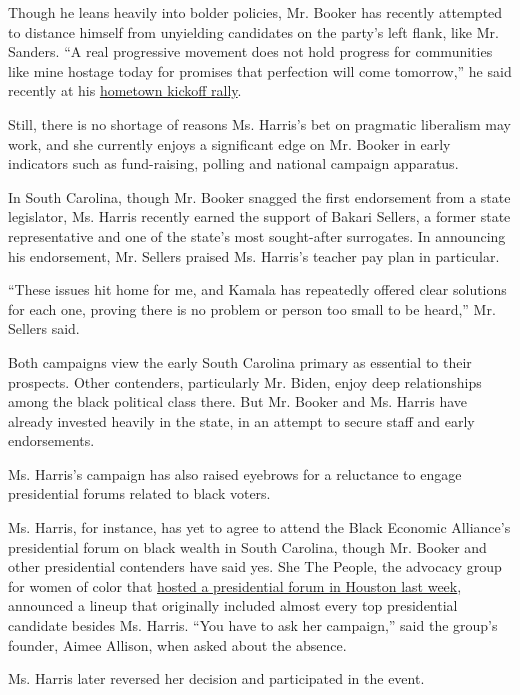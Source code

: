 Though he leans heavily into bolder policies, Mr. Booker has recently
attempted to distance himself from unyielding candidates on the party's
left flank, like Mr. Sanders. ``A real progressive movement does not
hold progress for communities like mine hostage today for promises that
perfection will come tomorrow,'' he said recently at his
\href{https://www.nytimes.com/2019/04/13/us/politics/cory-booker-newark.html}{hometown
kickoff rally}.

Still, there is no shortage of reasons Ms. Harris's bet on pragmatic
liberalism may work, and she currently enjoys a significant edge on Mr.
Booker in early indicators such as fund-raising, polling and national
campaign apparatus.

In South Carolina, though Mr. Booker snagged the first endorsement from
a state legislator, Ms. Harris recently earned the support of Bakari
Sellers, a former state representative and one of the state's most
sought-after surrogates. In announcing his endorsement, Mr. Sellers
praised Ms. Harris's teacher pay plan in particular.

``These issues hit home for me, and Kamala has repeatedly offered clear
solutions for each one, proving there is no problem or person too small
to be heard,'' Mr. Sellers said.

Both campaigns view the early South Carolina primary as essential to
their prospects. Other contenders, particularly Mr. Biden, enjoy deep
relationships among the black political class there. But Mr. Booker and
Ms. Harris have already invested heavily in the state, in an attempt to
secure staff and early endorsements.

Ms. Harris's campaign has also raised eyebrows for a reluctance to
engage presidential forums related to black voters.

Ms. Harris, for instance, has yet to agree to attend the Black Economic
Alliance's presidential forum on black wealth in South Carolina, though
Mr. Booker and other presidential contenders have said yes. She The
People, the advocacy group for women of color that
\href{https://www.nytimes.com/2019/04/24/us/politics/she-the-people-forum-2020-women.html}{hosted
a presidential forum in Houston last week}, announced a lineup that
originally included almost every top presidential candidate besides Ms.
Harris. ``You have to ask her campaign,'' said the group's founder,
Aimee Allison, when asked about the absence.

Ms. Harris later reversed her decision and participated in the event.


